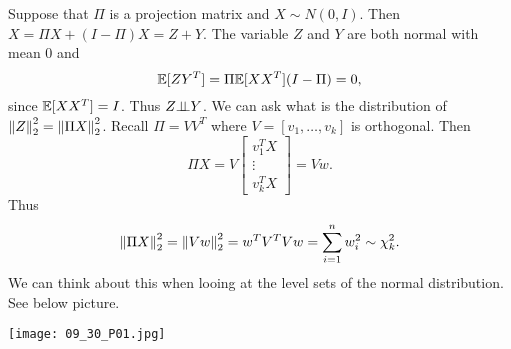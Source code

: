 Suppose that $\Pi$ is a projection matrix and $X \sim N(0,I)$. Then $X = \Pi  X+(I-\Pi)X = Z + Y$. The variable $Z$ and $Y$ are both normal with mean 0 and 
\[{\mathbb{E}}[ZY^T]= \Pi{\mathbb{E}}[XX^T](I-\Pi) = 0, \]
since ${\mathbb{E}}[XX^T] = I$. Thus $Z {\perp\!\!\!\perp} Y$. We can ask what is the distribution of $\left\|Z\right\|_2^2 = \left\|\Pi X\right\|_2^2$. Recall $\Pi = VV^T$ where $V = [v_1,\ldots, v_k]$ is orthogonal. Then 
\[\Pi X = V\begin{bmatrix}
    v_1^TX\\\vdots \\ v_k^TX
\end{bmatrix} = Vw. \]
Thus 
\[\left\|\Pi X\right\|_2^2 = \left\|Vw\right\|_2^2 = w^TV^TVw = \sum_{i=1}^n w_i^2 \sim \chi^2_k. \]
We can think about this when looing at the level sets of the normal distribution. See below picture.
\begin{center}
    
    \texttt{[image: 09\_30\_P01.jpg]}
    
\end{center}

